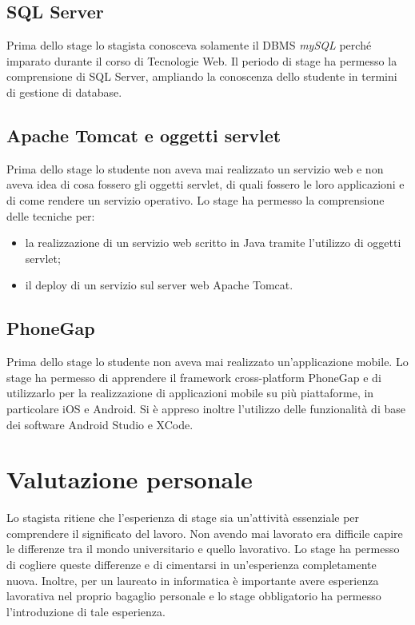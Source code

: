 \subsection{SQL Server}

Prima dello stage lo stagista conosceva solamente il DBMS \textit{mySQL} perché imparato durante il corso di Tecnologie Web. Il periodo di stage ha permesso la comprensione di SQL Server, ampliando la conoscenza dello studente in termini di gestione di database.

\subsection{Apache Tomcat e oggetti servlet}

Prima dello stage lo studente non aveva mai realizzato un servizio web e non aveva idea di cosa fossero gli oggetti servlet, di quali fossero le loro applicazioni e di come rendere un servizio operativo. Lo stage ha permesso la comprensione delle tecniche per:
\begin{itemize}
	\item la realizzazione di un servizio web scritto in Java tramite l'utilizzo di oggetti servlet;
	\item il deploy di un servizio sul server web Apache Tomcat.
\end{itemize}

\subsection{PhoneGap}

Prima dello stage lo studente non aveva mai realizzato un'applicazione mobile. Lo stage ha permesso di apprendere il framework cross-platform PhoneGap e di utilizzarlo per la realizzazione di applicazioni mobile su più piattaforme, in particolare iOS e Android. Si è appreso inoltre l'utilizzo delle funzionalità di base dei software Android Studio e XCode.

\section{Valutazione personale}

Lo stagista ritiene che l'esperienza di stage sia un'attività essenziale per comprendere il significato del lavoro. Non avendo mai lavorato era difficile capire le differenze tra il mondo universitario e quello lavorativo. Lo stage ha permesso di cogliere queste differenze e di cimentarsi in un'esperienza completamente nuova. Inoltre, per un laureato in informatica è importante avere esperienza lavorativa nel proprio bagaglio personale e lo stage obbligatorio ha permesso l'introduzione di tale esperienza.

